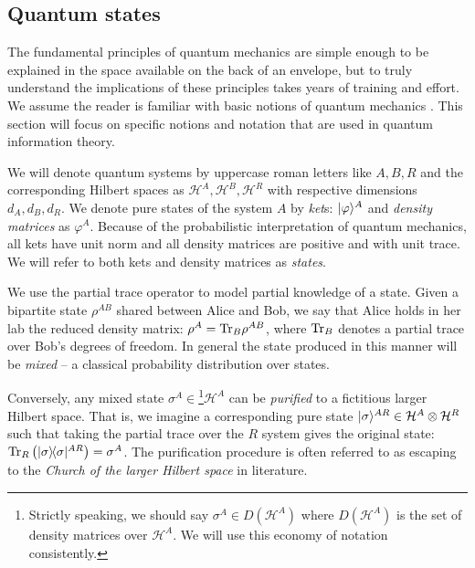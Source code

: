 \documentclass[aps,11pt,twoside,letterpaper]{article}
\def\Tr{\textup{Tr}}
\def\ph{\varphi}
\def\cH{\mathcal{H}}
\theoremstyle{plain}
\theoremstyle{definition}
\begin{document}
		

		\bigskip
		\subsection{Quantum states}
			
			The fundamental principles of quantum mechanics are simple enough to be explained in the space
			available on the back of an envelope, but to truly understand the implications of these
			principles takes years of training and effort.
			We assume the reader is familiar with basic notions of quantum mechanics \cite{sakurai,NC04}. 
			This section will focus on specific notions and notation that are used in quantum information theory.
			
			We will denote quantum systems by uppercase roman letters like $A,B,R$ and the corresponding 
			Hilbert spaces as $\cH^A, \cH^B, \cH^R$ with respective dimensions $d_A,d_B,d_R$.
		    We denote pure states of the system $A$ by \emph{ket}s: $\ket{\ph}^A$
		    and \emph{density matrices} as $\ph^A$.		%
			Because of the probabilistic interpretation of quantum mechanics, all kets have unit norm and all
			density matrices are positive and with unit trace.
		    We will refer to both kets and density matrices as \emph{states}.
		    
			We use the partial trace operator to model partial knowledge of a state.
			Given a bipartite state $\rho^{AB}$ shared between Alice and Bob, we say that Alice holds in her lab
			the reduced density matrix: $\rho^A = \Tr_B\rho^{AB}$, where $\Tr_B$ denotes a partial trace over 
			Bob's degrees of freedom.
			In general the state produced in this manner will be \emph{mixed} -- a classical probability distribution
			over states.
			
			Conversely, any mixed state $\sigma^A \in$\footnote{Strictly speaking, we should say 
			$\sigma^A \in D(\cH^A)$ where $D(\cH^A)$ is the set of density matrices over $\cH^A$. 
			We will use this economy of notation consistently.}$\cH^A$
			 can be \emph{purified} to a fictitious 
			larger Hilbert space. 
			That is, we imagine a corresponding pure state $\ket{\sigma}^{AR} \in \cH^A \otimes \cH^R$
			such that taking the partial trace over the $R$ system gives the original state: 
			$\Tr_R\left(\proj{\sigma}^{AR}\right)=\sigma^A$. 
			The purification procedure is often referred to as escaping to the \emph{Church of the larger
			Hilbert space} in literature.
\end{document}
